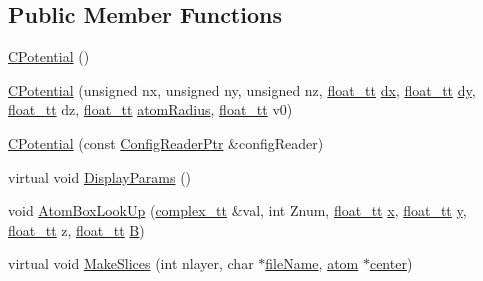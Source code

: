 \subsection*{Public Member Functions}
\begin{DoxyCompactItemize}
\item 
\hyperlink{class_q_s_t_e_m_1_1_c_potential_a854fb18cfde1ced01284ef26db88f7e2}{C\-Potential} ()
\item 
\hyperlink{class_q_s_t_e_m_1_1_c_potential_a776766cc08acf7dcf7c8cb70cc0f5e82}{C\-Potential} (unsigned nx, unsigned ny, unsigned nz, \hyperlink{namespace_q_s_t_e_m_a915d7caa497280d9f927c4ce8d330e47}{float\-\_\-tt} \hyperlink{image_sim_8m_a3bd72991d01b3af4f1ed8ea1317879de}{dx}, \hyperlink{namespace_q_s_t_e_m_a915d7caa497280d9f927c4ce8d330e47}{float\-\_\-tt} \hyperlink{showimage_8m_ac6bb4b856c3d13f19466d849c6ae0138}{dy}, \hyperlink{namespace_q_s_t_e_m_a915d7caa497280d9f927c4ce8d330e47}{float\-\_\-tt} dz, \hyperlink{namespace_q_s_t_e_m_a915d7caa497280d9f927c4ce8d330e47}{float\-\_\-tt} \hyperlink{qstem_8m_a771570fcbf7eebdfa7d620704a8789a0}{atom\-Radius}, \hyperlink{namespace_q_s_t_e_m_a915d7caa497280d9f927c4ce8d330e47}{float\-\_\-tt} v0)
\item 
\hyperlink{class_q_s_t_e_m_1_1_c_potential_a9847fdc7c46ee0488cc883956fd75f3d}{C\-Potential} (const \hyperlink{namespace_q_s_t_e_m_af9424707fe9f6503298f49b41304bd35}{Config\-Reader\-Ptr} \&config\-Reader)
\item 
virtual void \hyperlink{class_q_s_t_e_m_1_1_c_potential_ab76efc606ed2bee0b7e89d6a22c82de9}{Display\-Params} ()
\item 
void \hyperlink{class_q_s_t_e_m_1_1_c_potential_a0bac8970d10240f529d4609ed36c03aa}{Atom\-Box\-Look\-Up} (\hyperlink{namespace_q_s_t_e_m_afa320ea3cd2f5ff080c422f81b803a32}{complex\-\_\-tt} \&val, int Znum, \hyperlink{namespace_q_s_t_e_m_a915d7caa497280d9f927c4ce8d330e47}{float\-\_\-tt} \hyperlink{_read_d_m3___matlab_8m_a9336ebf25087d91c818ee6e9ec29f8c1}{x}, \hyperlink{namespace_q_s_t_e_m_a915d7caa497280d9f927c4ce8d330e47}{float\-\_\-tt} \hyperlink{qmb_8m_a2fb1c5cf58867b5bbc9a1b145a86f3a0}{y}, \hyperlink{namespace_q_s_t_e_m_a915d7caa497280d9f927c4ce8d330e47}{float\-\_\-tt} z, \hyperlink{namespace_q_s_t_e_m_a915d7caa497280d9f927c4ce8d330e47}{float\-\_\-tt} \hyperlink{xyz2cfg_8m_a422e4e22a48b9ea42c9dfe12b157229d}{B})
\item 
virtual void \hyperlink{class_q_s_t_e_m_1_1_c_potential_a5a7af8b88594ddf08876b47f4de31d3f}{Make\-Slices} (int nlayer, char $\ast$\hyperlink{qmb_8m_a7a230f02bdffebd1357e3c0b49e01271}{file\-Name}, \hyperlink{namespace_q_s_t_e_m_a402dabc31a7a1fe906d0cdd138c69686}{atom} $\ast$\hyperlink{_displacement_params_8m_a02389a9bda512aa8f8a3345f4fa27f25}{center})

\end{DoxyCompactItemize}
